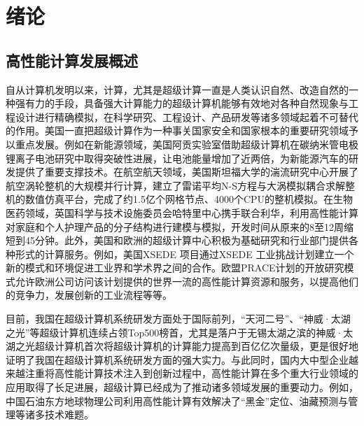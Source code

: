 \documentclass[degree=doctor]{thuthesis}
\begin{document}
\frontmatter

\tableofcontents




\mainmatter

\chapter{绪论}

\section{高性能计算发展概述}

自从计算机发明以来，计算，尤其是超级计算一直是人类认识自然、改造自然的一种强有力的手段，具备强大计算能力的超级计算机能够有效地对各种自然现象与工程设计进行精确模拟，在科学研究、工程设计、产品研发等诸多领域起着不可替代的作用。美国一直把超级计算作为一种事关国家安全和国家根本的重要研究领域予以重点发展。例如在新能源领域，美国阿贡实验室借助超级计算机在碳纳米管电极锂离子电池研究中取得突破性进展，让电池能量增加了近两倍，为新能源汽车的研发提供了重要支撑技术\cite{xiong2012self}。在航空航天领域，美国斯坦福大学的湍流研究中心开展了航空涡轮整机的大规模并行计算，建立了雷诺平均N-S方程与大涡模拟耦合求解整机的数值仿真平台，完成了约1.5亿个网格节点、4000个CPU的整机模拟\cite{reynolds2003aircraft}。在生物医药领域，英国科学与技术设施委员会哈特里中心携手联合利华，利用高性能计算对家庭和个人护理产品的分子结构进行建模与模拟，开发时间从原来的8至12周缩短到45分钟\cite{Unilever}。此外，美国和欧洲的超级计算中心积极为基础研究和行业部门提供各种形式的计算服务。例如，美国XSEDE 项目通过XSEDE 工业挑战计划建立一个新的模式和环境促进工业界和学术界之间的合作\cite{Unilever}。欧盟PRACE计划的开放研究模式允许欧洲公司访问该计划提供的世界一流的高性能计算资源和服务\cite{PRACE}，以提高他们的竞争力，发展创新的工业流程等等。

目前，我国在超级计算机系统研发方面处于国际前列，“天河二号”\cite{tianhe-2}、“神威·太湖之光”\cite{fu2016sunway}等超级计算机连续占领Top500榜首，尤其是落户于无锡太湖之滨的神威·太湖之光超级计算机首次将超级计算机的计算能力提高到百亿亿次量级\cite{fu2016sunway}，更是很好地证明了我国在超级计算机系统研发方面的强大实力。与此同时，国内大中型企业越来越注重将高性能计算技术注入到创新过程中，高性能计算在多个重大行业领域的应用取得了长足进展，超级计算已经成为了推动诸多领域发展的重要动力。例如，中国石油东方地球物理公司利用高性能计算有效解决了“黑金”定位、油藏预测与管理等诸多技术难题\cite{luo2007hpc}。
\end{document}
